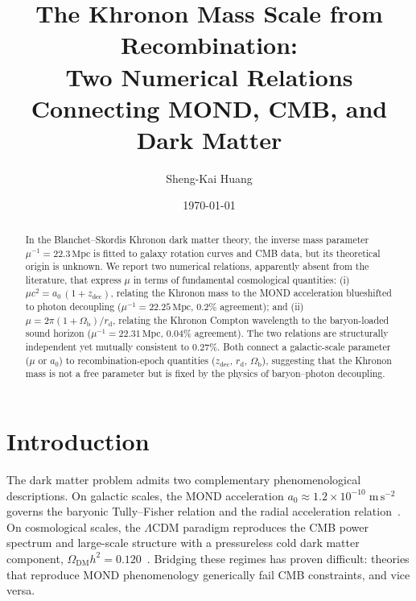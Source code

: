 \documentclass[prl,twocolumn,superscriptaddress,longbibliography]{revtex4-2}
\newcommand{\Mpc}{\,\mathrm{Mpc}}
\newcommand{\zdec}{z_{\mathrm{dec}}}
\newcommand{\rd}{r_{\mathrm{d}}}
\newcommand{\Ob}{\Omega_{\mathrm{b}}}
\newcommand{\Odm}{\Omega_{\mathrm{DM}}}
\begin{document}
\title{The Khronon Mass Scale from Recombination:\\
Two Numerical Relations Connecting MOND, CMB,
and Dark Matter}

\author{Sheng-Kai Huang}

\date{\today}

\begin{abstract}
In the Blanchet--Skordis Khronon dark matter theory,
the inverse mass parameter $\mu^{-1} = 22.3\Mpc$ is
fitted to galaxy rotation curves and CMB data, but
its theoretical origin is unknown.
We report two numerical relations, apparently absent
from the literature, that express $\mu$ in terms of
fundamental cosmological quantities:
(i)~$\mu c^2 = a_0\,(1 + \zdec)$,
relating the Khronon mass to the MOND acceleration
blueshifted to photon decoupling ($\mu^{-1} = 22.25\Mpc$,
$0.2\%$ agreement); and
(ii)~$\mu = 2\pi(1 + \Ob)/\rd$,
relating the Khronon Compton wavelength to the
baryon-loaded sound horizon
($\mu^{-1} = 22.31\Mpc$, $0.04\%$ agreement).
The two relations are structurally independent yet
mutually consistent to $0.27\%$.
Both connect a galactic-scale parameter ($\mu$ or $a_0$)
to recombination-epoch quantities ($\zdec$, $\rd$, $\Ob$),
suggesting that the Khronon mass is not a free parameter
but is fixed by the physics of baryon--photon decoupling.
\end{abstract}

\maketitle


\section{Introduction}
\label{sec:intro}

The dark matter problem admits two complementary
phenomenological descriptions.
On galactic scales, the MOND acceleration
$a_0 \approx 1.2 \times 10^{-10}\;\mathrm{m\,s}^{-2}$
governs the baryonic Tully--Fisher relation and the
radial acceleration relation~\cite{Milgrom1983,McGaugh2016}.
On cosmological scales, the $\Lambda$CDM paradigm
reproduces the CMB power spectrum and large-scale structure
with a pressureless cold dark matter component,
$\Odm h^2 = 0.120$~\cite{Planck2018}.
Bridging these regimes has proven difficult:
theories that reproduce MOND phenomenology generically
fail CMB constraints, and vice versa.
\end{document}

